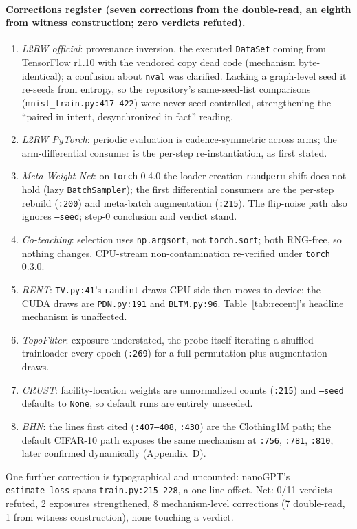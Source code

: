 \documentclass[10pt,letterpaper]{article}
\theoremstyle{remark}
\newcommand{\code}[1]{\texttt{#1}}
\begin{document}
\paragraph{Corrections register (seven corrections from the double-read,
an eighth from witness construction; zero verdicts refuted).}
\begin{enumerate}\itemsep2pt
\item \emph{L2RW official}: provenance inversion, the executed \code{DataSet}
coming from TensorFlow r1.10 with the vendored copy dead code (mechanism
byte-identical); a confusion about \code{nval} was clarified. Lacking a graph-level seed
it re-seeds from entropy, so the repository's same-seed-list comparisons
(\code{mnist\_train.py:417--422}) were never seed-controlled, strengthening
the ``paired in intent, desynchronized in fact'' reading.
\item \emph{L2RW PyTorch}: periodic evaluation is cadence-symmetric across
arms; the arm-differential consumer is the per-step re-instantiation, as first
stated.
\item \emph{Meta-Weight-Net}: on \code{torch} 0.4.0 the loader-creation
\code{randperm} shift does not hold (lazy \code{BatchSampler}); the first
differential consumers are the per-step rebuild (\code{:200}) and meta-batch
augmentation (\code{:215}). The flip-noise path also ignores \code{--seed};
step-0 conclusion and verdict stand.
\item \emph{Co-teaching}: selection uses \code{np.argsort}, not
\code{torch.sort}; both RNG-free, so nothing changes. CPU-stream
non-contamination re-verified under \code{torch} 0.3.0.
\item \emph{RENT}: \code{TV.py:41}'s \code{randint} draws CPU-side then moves
to device; the CUDA draws are \code{PDN.py:191} and \code{BLTM.py:96}.
Table~\ref{tab:recent}'s headline mechanism is unaffected.
\item \emph{TopoFilter}: exposure understated, the probe itself iterating a
shuffled trainloader every epoch (\code{:269}) for a full permutation plus
augmentation draws.
\item \emph{CRUST}: facility-location weights are unnormalized counts
(\code{:215}) and \code{--seed} defaults to \code{None}, so default runs are
entirely unseeded.
\item \emph{BHN}: the lines first cited (\code{:407--408}, \code{:430}) are
the Clothing1M path; the default CIFAR-10 path exposes the same mechanism at
\code{:756}, \code{:781}, \code{:810}, later confirmed dynamically
(Appendix~D).
\end{enumerate}
One further correction is typographical and uncounted: nanoGPT's
\code{estimate\_loss} spans \code{train.py:215--228}, a one-line offset. Net:
0/11 verdicts refuted, 2 exposures strengthened, 8 mechanism-level corrections
(7 double-read, 1 from witness construction), none touching a verdict.
\end{document}
